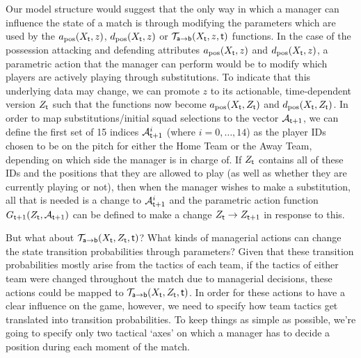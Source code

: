 Our model structure would suggest that the only way in which a manager can influence the state of a match is through modifying the parameters which are used by the $a_{\rm pos}(X_{\sf t},z)$, $d_{\rm pos}(X_{\sf t},z)$ or ${\cal T}_{{\sf a}\rightarrow {\sf b}}(X_{\sf t},z,{\sf t})$ functions. In the case of the possession attacking and defending attributes $a_{\rm pos}(X_{\sf t},z)$ and $d_{\rm pos}(X_{\sf t},z)$, a parametric action that the manager can perform would be to modify which players are actively playing through substitutions. To indicate that this underlying data may change, we can promote $z$ to its actionable, time-dependent version $Z_{{\sf t}}$ such that the functions now become $a_{\rm pos}(X_{\sf t},Z_{\sf t})$ and $d_{\rm pos}(X_{\sf t},Z_{\sf t})$. In order to map substitutions/initial squad selections to the vector ${\cal A}_{{\sf t}+1}$, we can define the first set of 15 indices ${\cal A}_{{\sf t}+1}^i$ (where $i=0,\dots , 14$) as the player IDs chosen to be on the pitch for either the {\sf Home Team} or the {\sf Away Team}, depending on which side the manager is in charge of. If $Z_{\sf t}$ contains all of these IDs and the positions that they are allowed to play (as well as whether they are currently playing or not), then when the manager wishes to make a substitution, all that is needed is a change to ${\cal A}_{{\sf t}+1}^i$ and the parametric action function $G_{{\sf t}+1}(Z_{\sf t},{\cal A}_{{\sf t}+1})$ can be defined to make a change $Z_{\sf t}\rightarrow Z_{{\sf t}+1}$ in response to this.

But what about ${\cal T}_{{\sf a}\rightarrow {\sf b}}(X_{\sf t},Z_{\sf t},{\sf t})$? What kinds of managerial actions can change the state transition probabilities through parameters? Given that these transition probabilities mostly arise from the tactics of each team, if the tactics of either team were changed throughout the match due to managerial decisions, these actions could be mapped to ${\cal T}_{{\sf a}\rightarrow {\sf b}}(X_{\sf t},Z_{\sf t},{\sf t})$. In order for these actions to have a clear influence on the game, however, we need to specify how team tactics get translated into transition probabilities. To keep things as simple as possible, we're going to specify only two tactical `axes' on which a manager has to decide a position during each moment of the match.

